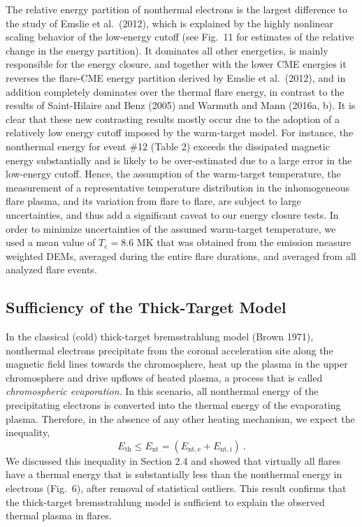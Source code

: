 \documentclass[10pt,preprint]{aastex}  %
\begin{document}
The relative energy partition of 
nonthermal electrons is the largest difference to the study of
Emslie et al.~(2012), which is explained by the highly nonlinear
scaling behavior of the low-energy cutoff (see Fig.~11 for estimates
of the relative change in the energy partition). It dominates all 
other energetics, is mainly responsible for the energy closure, 
and together with the lower CME energies it reverses the
flare-CME energy partition derived by Emslie et al.~(2012), and in
addition completely dominates over the thermal flare energy,
in contrast to the results of Saint-Hilaire and Benz (2005) and 
Warmuth and Mann (2016a, b). It is clear that these new contrasting
results mostly occur due to the adoption of a relatively low 
energy cutoff imposed by the warm-target model. 
For instance, the nonthermal energy for event \#12 (Table 2)
exceeds the dissipated magnetic energy substantially and is
likely to be over-estimated due to a large error in the
low-energy cutoff. Hence, the assumption of the warm-target 
temperature, the measurement of a representative temperature 
distribution in the inhomogeneous flare plasma, and its 
variation from flare to flare, are subject to large uncertainties,
and thus add a significant caveat to our energy closure tests.
In order to minimize uncertainties of the assumed warm-target
temperature, we used a mean value of $T_e=8.6$ MK that was
obtained from the emission measure weighted DEMs, averaged 
during the entire flare durations, and averaged from all 
analyzed flare events.

\subsection{	Sufficiency of the Thick-Target Model   }

In the classical (cold) thick-target bremsstrahlung model (Brown 1971), 
nonthermal electrons precipitate from the coronal acceleration
site along the magnetic field lines towards the chromosphere,
heat up the plasma in the upper chromosphere and drive upflows
of heated plasma, a process that is called {\sl chromospheric
evaporation}. In this scenario, all nonthermal energy of the
precipitating electrons is converted into the thermal energy 
of the evaporating plasma. Therefore, in the absence of any
other heating mechanism, we expect the inequality,
\begin{equation}
	E_{\mathrm{th}} \le E_{\mathrm{nt}} = 
	( E_{\mathrm{nt,e}} + E_{\mathrm{nt,i}} ) \ .
\end{equation}
We discussed this inequality in Section 2.4 and showed
that virtually all flares have a thermal energy that is
substantially less than the nonthermal energy in electrons
(Fig.~6), after removal of statistical outliers. This result
confirms that the thick-target bremsstrahlung model is
sufficient to explain the observed thermal plasma in flares. 
\end{document}

